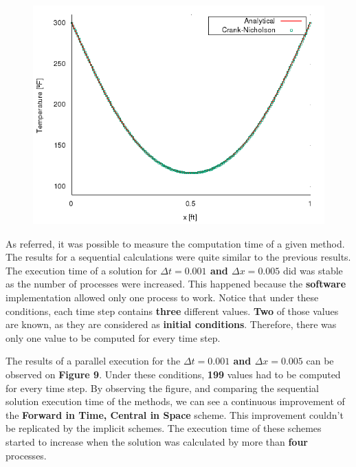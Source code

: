\documentclass[12pt]{article}
\begin{document}
\begin{figure}[!htb]
\begin{minipage}{.28\textwidth}
  \includegraphics[width=1\linewidth]{cn.png}
\end{minipage}
\end{figure}

\par As referred, it was possible to measure the computation time of a given method. The results for a sequential calculations were quite similar to the previous results\cite{fraga}. The execution time of a solution for \textbf{$ \Delta t = 0.001 $ and $ \Delta x = 0.005$} did was stable as the number of processes were increased. This happened because the \textbf{software} implementation allowed only one process to work. Notice that under these conditions, each time step contains \textbf{three} different values. \textbf{Two} of those values are known, as they are considered as \textbf{initial conditions}. Therefore, there was only one value to be computed for every time step. 

\par The results of a parallel execution for the \textbf{$ \Delta t = 0.001 $ and $ \Delta x = 0.005$} can be observed on \textbf{Figure 9}. Under these conditions, \textbf{199} values had to be computed for every time step. By observing the figure, and comparing the sequential solution execution time of the methods, we can see a continuous improvement of the \textbf{Forward in Time, Central in Space} scheme. This improvement couldn't be replicated by the implicit schemes. The execution time of these schemes started to increase when the solution was calculated by more than \textbf{four} processes. 
\end{document}
